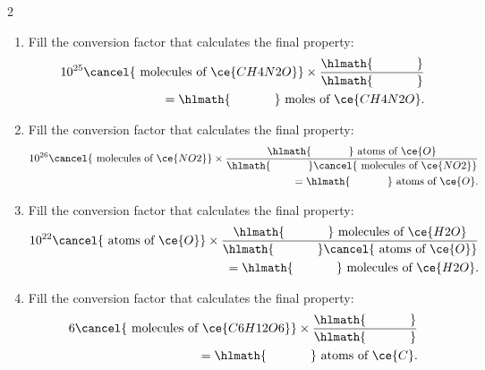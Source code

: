 \documentclass[main.tex]{subfiles}
\begin{document}
\begin{multicols*}{2}
\begin{enumerate}
\item Fill the conversion factor that calculates the final property:
 \begin{equation*}\begin{split}
10^{25}\cancel{\text{ molecules of }\ce{CH4N2O}} \times \dfrac{\hlmath{\hspace{35pt}}}{\hlmath{\hspace{35pt}}}\\
=\hlmath{\hspace{35pt}}\text{ moles of }\ce{CH4N2O}.
\end{split}\end{equation*}



\item Fill the conversion factor that calculates the final property:
 \begin{equation*}\begin{split}
10^{26}\cancel{\text{ molecules of }\ce{NO2}} \times \dfrac{\hlmath{\hspace{35pt}}\text{ atoms of }\ce{O}}{\hlmath{\hspace{35pt}}\cancel{\text{ molecules of }\ce{NO2}}}\\
=\hlmath{\hspace{35pt}}\text{ atoms of }\ce{O}.
\end{split}\end{equation*}


\item Fill the conversion factor that calculates the final property:
 \begin{equation*}\begin{split}
10^{22}\cancel{\text{ atoms of }\ce{O}} \times \dfrac{\hlmath{\hspace{35pt}}\text{ molecules of }\ce{H2O}}{\hlmath{\hspace{35pt}}\cancel{\text{ atoms of }\ce{O}}}\\
=\hlmath{\hspace{35pt}}\text{ molecules of }\ce{H2O}.
\end{split}\end{equation*}


\item Fill the conversion factor that calculates the final property:
 \begin{equation*}\begin{split}
6\cancel{\text{ molecules of }\ce{C6H12O6}} \times \dfrac{\hlmath{\hspace{35pt}}}{\hlmath{\hspace{35pt}}}\\
=\hlmath{\hspace{35pt}}\text{ atoms of }\ce{C}.
\end{split}\end{equation*}



\end{enumerate}
\end{multicols*}
\end{document}
